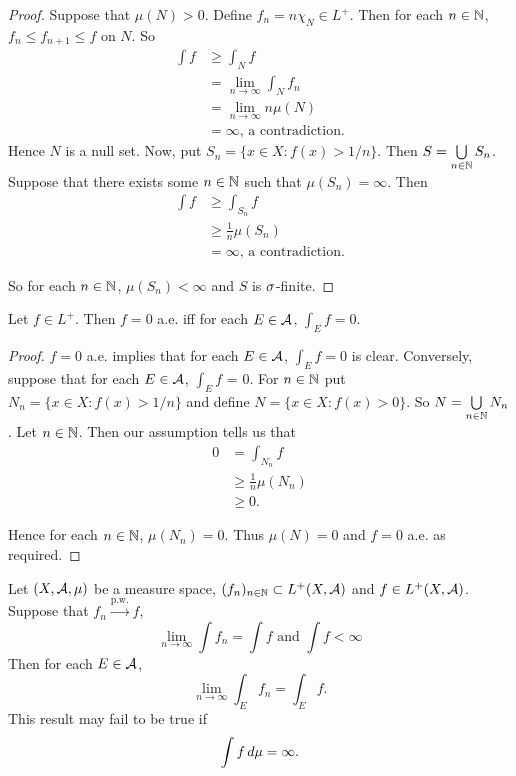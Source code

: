 \documentclass{book}
\begin{document}
	\begin{proof}
		Suppose that $\mu(N) > 0$. Define $f_n = n \chi_{N} \in L^+$. Then for each $n \in \mathbb{N}$, $f_n \leq f_{n+1} \leq f$ on $N$. So 
		\begin{align*}
			\int f 
			&\geq \int_N f\\ 
			&= \lim\limits_{n \rightarrow \infty} \int_N f_n\\ 
			&= \lim\limits_{n \rightarrow \infty} n\mu(N)\\
			&= \infty \text{, a contradiction.}
		\end{align*}
		Hence $N$ is a null set. Now, put $S_n = \{x \in X: f(x)>1/n\}$. Then $S = \bigcup \limits_{n \in \mathbb{N}}S_n$. Suppose that there exists some $n \in \mathbb{N}$ such that $\mu(S_n) = \infty$. Then 
		\begin{align*}
			\int f 
			&\geq \int_{S_n} f \\
			&\geq \frac{1}{n}\mu(S_n) \\
			&= \infty \text{, a contradiction.}
		\end{align*}
		
		So for each $n \in \mathbb{N}$, $\mu(S_n) < \infty$ and $S$ is $\sigma$-finite.
	\end{proof}
	
	\begin{ex}  
		Let $f \in L^+$. Then $f =0$ a.e. iff for each $E \in \mathcal{A}$, $\int_E f =0$.
	\end{ex}
	
	\begin{proof}
		$f = 0$ a.e. implies that for each $E \in \mathcal{A}$, $\int_E f =0$ is clear. Conversely, suppose that for each $E \in \mathcal{A}$, $\int_E f$ = 0. For $n \in \mathbb{N}$ put $N_n = \{x \in X: f(x) > 1/n\}$ and define $N = \{x \in X: f(x)>0\}$. So $N = \bigcup\limits_{n \in \mathbb{N}} N_n$. Let $n \in \mathbb{N}$. Then our assumption tells us that 
		\begin{align*}
			0 
			&= \int_{N_n} f \\
			& \geq \frac{1}{n}\mu(N_n)\\
			& \geq 0.
		\end{align*} 
		
		Hence for each $n \in \mathbb{N}$, $\mu(N_n) = 0$. Thus $\mu(N) = 0$ and $f =0$ a.e. as required.
		
	\end{proof}
	
	\begin{ex} 
		Let $(X, \mathcal{A}, \mu)$ be a measure space, $(f_n)_{n \in \mathbb{N}} \subset L^+(X, \mathcal{A})$ and $f \in L^+(X, \mathcal{A})$. Suppose that $f_n \xrightarrow{\text{p.w.}} f$, 
		$$\lim \limits_{n \rightarrow \infty} \int f_n = \int f \text{ and } \int f < \infty$$
		Then for each $E \in \mathcal{A}$, 
		$$\lim \limits_{n \rightarrow \infty} \int_E f_n = \int_E f.$$ 
		This result may fail to be true if 
		$$\int f \, d \mu = \infty.$$
		
	\end{ex}
	
\end{document}
